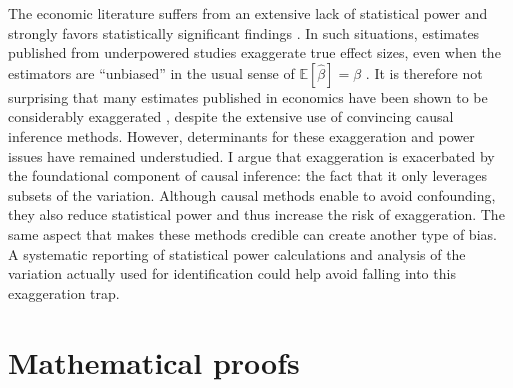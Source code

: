 \documentclass[usletter, 12pt]{article}
\begin{document}
	The economic literature suffers from an extensive lack of statistical power \citep{ioannidis_power_2017} and strongly favors statistically significant findings \citep[for instance]{rosenthal_file_1979, andrews_identification_2019, abadie_statistical_2020, brodeur_methods_2020}. In such situations, estimates published from underpowered studies exaggerate true effect sizes, even when the estimators are ``unbiased'' in the usual sense of $\mathbb{E}[\hat{\beta}] = \beta$ \citep{ioannidis_why_2008, gelman_beyond_2014, lu_note_2019, zwet_significance_2021}. It is therefore not surprising that many estimates published in economics have been shown to be considerably exaggerated  \citep{camerer_evaluating_2016, ioannidis_power_2017}, despite the extensive use of convincing causal inference methods.  However, determinants for these exaggeration and power issues have remained understudied. I argue that exaggeration is exacerbated by the foundational component of causal inference: the fact that it only leverages subsets of the variation. Although causal methods enable to avoid confounding, they also reduce statistical power and thus increase the risk of exaggeration. The same aspect that makes these methods credible can create another type of bias. A systematic reporting of statistical power calculations and analysis of the variation actually used for identification could help avoid falling into this exaggeration trap.
	
	





		
	
\newpage
	



\newpage

\appendix

	\section{Mathematical proofs}\label{maths_proofs}
	
\end{document}
